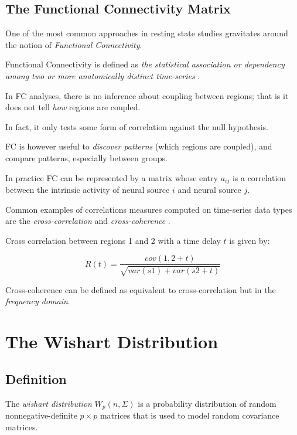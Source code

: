 \documentclass[12pt,openright,twoside,a4paper]{book}
\begin{document}
\section{The Functional Connectivity Matrix}

One of the most common approaches in resting state studies gravitates around the notion of \textit{Functional Connectivity}.

Functional Connectivity is defined as \textit{the statistical association or dependency among two or more anatomically distinct time-series} \cite{connect}.
\vspace{5mm}

In FC analyses, there is no inference about coupling between regions; that is it does not tell \textit{how} regions are coupled.

In fact, it only tests some form of correlation against the null hypothesis.

FC is however useful to \textit{discover patterns} (which regions are coupled), and compare patterns, especially between groups.

In practice FC can be represented by a matrix whose entry $a_{ij}$ is a correlation between the intrinsic activity of neural source $i$ and neural source $j$.
\vspace{5mm}

Common examples of correlations measures computed on time-series data types are the \textit{cross-correlation} and \textit{cross-coherence} \cite{connect}.

Cross correlation between regions 1 and 2 with a time delay $t$ is given by:

\begin{equation}
R(t)= \frac{cov(1,2+t)}{\sqrt{var(s1)+var(s2+t)}}
\end{equation}

Cross-coherence can be defined as equivalent to cross-correlation but in the \textit{frequency domain}.

\chapter{The Wishart Distribution}

\section{Definition}

The \textit{wishart distribution} $ W_p(n, \Sigma)$ is a probability distribution of random nonnegative-definite $p\times p$ matrices that is used to model random covariance matrices.
\end{document}
